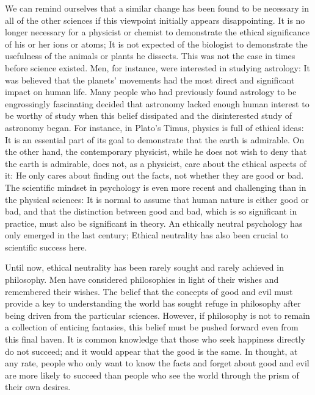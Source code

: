 \documentclass[a4paper,12pt]{book}[2004/02/16]
\theoremstyle{ilemma}
\theoremstyle{itheorem}
\theoremstyle{iother}
\theoremstyle{icorollary}
\theoremstyle{numcorollary}
\theoremstyle{idefinition}
\begin{document}
We can remind ourselves that a similar change has been found to be necessary in all of the other sciences if this viewpoint initially appears disappointing. It is no longer necessary for a physicist or chemist to demonstrate the ethical significance of his or her ions or atoms; It is not expected of the biologist to demonstrate the usefulness of the animals or plants he dissects. This was not the case in times before science existed. Men, for instance, were interested in studying astrology: It was believed that the planets' movements had the most direct and significant impact on human life. Many people who had previously found astrology to be engrossingly fascinating decided that astronomy lacked enough human interest to be worthy of study when this belief dissipated and the disinterested study of astronomy began. For instance, in Plato's Timus, physics is full of ethical ideas: It is an essential part of its goal to demonstrate that the earth is admirable. On the other hand, the contemporary physicist, while he does not wish to deny that the earth is admirable, does not, as a physicist, care about the ethical aspects of it: He only cares about finding out the facts, not whether they are good or bad. The scientific mindset in psychology is even more recent and challenging than in the physical sciences: It is normal to assume that human nature is either good or bad, and that the distinction between good and bad, which is so significant in practice, must also be significant in theory. An ethically neutral psychology has only emerged in the last century; Ethical neutrality has also been crucial to scientific success here.

Until now, ethical neutrality has been rarely sought and rarely achieved in philosophy. Men have considered philosophies in light of their wishes and remembered their wishes. The belief that the concepts of good and evil must provide a key to understanding the world has sought refuge in philosophy after being driven from the particular sciences. However, if philosophy is not to remain a collection of enticing fantasies, this belief must be pushed forward even from this final haven. It is common knowledge that those who seek happiness directly do not succeed; and it would appear that the good is the same.
In thought, at any rate, people who only want to know the facts and forget about good and evil are more likely to succeed than people who see the world through the prism of their own desires.
\end{document}
